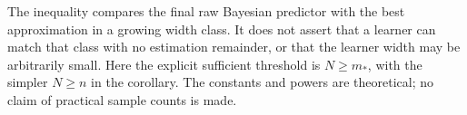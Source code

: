 The inequality compares the final raw Bayesian predictor with the best
approximation in a growing width class.  It does not assert that a learner
can match that class with no estimation remainder, or that the learner
width may be arbitrarily small.  Here the explicit sufficient threshold
is $N\ge m_*$, with the simpler $N\ge n$ in the corollary.  The constants
and powers are theoretical; no claim of practical sample counts is made.
